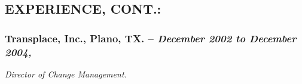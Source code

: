 \documentclass[10pt]{report}
\begin{document}
\subsection*{EXPERIENCE, CONT.:}

\subsubsection*{Transplace, Inc., Plano, TX. -- \emph{December 2002 to December
2004, }} 
    \emph{Director of Change Management.} 
%

%
%
%
%
%
%
%
%
%
%
%
%
\end{document}
